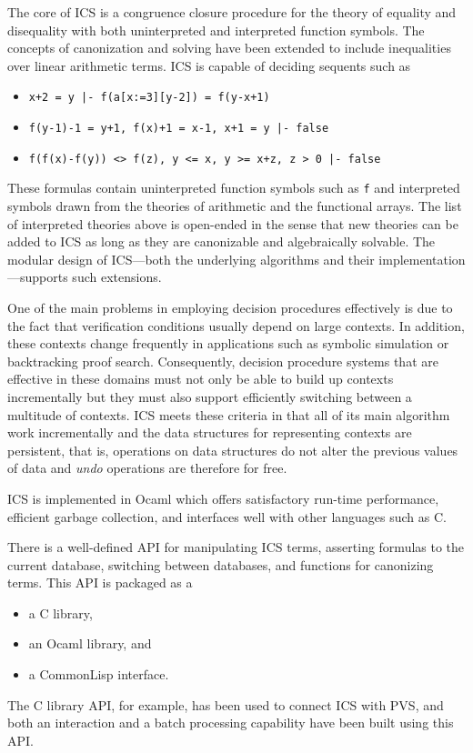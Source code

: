 \documentclass[12pt]{article}
\begin{document}
The core of ICS is a congruence closure procedure %
for the theory of equality and disequality with both uninterpreted and
interpreted function symbols.  The concepts of canonization and solving
have been extended to include inequalities over linear arithmetic
terms.  ICS is capable of deciding sequents such as
  \begin{itemize}
  \item {\tt x+2 = y |- f(a[x:=3][y-2]) = f(y-x+1)}
  \item {\tt f(y-1)-1 = y+1, f(x)+1 = x-1, x+1 = y |- false}
  \item {\tt f(f(x)-f(y)) <> f(z),  y <= x, y >= x+z, z > 0 |- false}
  \end{itemize}
These formulas contain uninterpreted function symbols
such as {\tt f} and interpreted symbols drawn from the theories of
arithmetic and the functional arrays.  The list of
interpreted theories above is open-ended in the sense that new
theories can be added to ICS as long as they are canonizable and
algebraically solvable. The modular design of ICS---both the
underlying algorithms and their implementation---supports such
extensions.

One of the main problems in employing decision procedures
effectively is due to the fact that verification conditions
usually depend on large contexts.  In addition, these
contexts change frequently in applications such as
symbolic simulation or backtracking proof search.
Consequently, decision procedure systems that
are effective in these domains must not only be able to
build up contexts incrementally but they must
also support efficiently switching between a multitude
of contexts.  ICS meets these criteria in that all of its
main algorithm work incrementally and the data
structures for representing contexts are persistent,
that is, operations on data structures do not alter the
previous values of data and {\em undo} operations
are therefore for free.

ICS is implemented in \textsf{Ocaml} %
which offers satisfactory run-time performance, efficient garbage collection, 
and interfaces well with other languages such as C\@. 

There is a well-defined API for manipulating ICS terms, asserting
formulas to the current database, switching between databases,
and functions for canonizing terms.  This API is packaged as a 
  \begin{itemize} 
  \item a C library, 
  \item an \textsf{Ocaml} library, and 
  \item a CommonLisp interface.
  \end{itemize}
The C library API, for example, has been used to connect ICS with PVS\@, %
and both an interaction and a batch processing capability have been built using 
this API\@.
\end{document}
